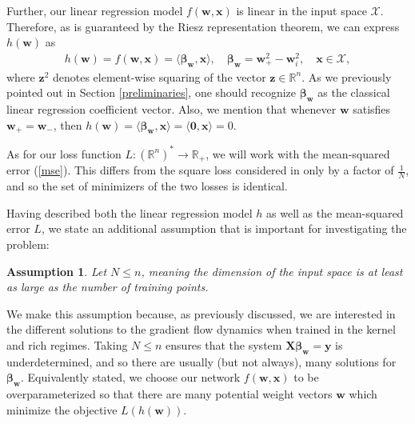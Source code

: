\documentclass{article}
\newtheorem*{assumption}{Assumption}
\begin{document}
Further, our linear regression model $f(\boldsymbol{w}, \boldsymbol{x})$ is linear in the input space $\mathcal{X}$. Therefore, as is guaranteed by the Riesz representation theorem, we can express $h(\boldsymbol{w})$ as 
\begin{align}
    h(\boldsymbol{w}) = f(\boldsymbol{w}, \boldsymbol{x}) = \langle \boldsymbol{\beta}_{\boldsymbol{w}}, \boldsymbol{x} \rangle, \quad \boldsymbol{\beta}_{\boldsymbol{w}} = \boldsymbol{w}_{+}^2 - \boldsymbol{w}_{i}^2, \quad \boldsymbol{x} \in \mathcal{X},
\end{align}
where $\boldsymbol{z}^2$ denotes element-wise squaring of the vector $\boldsymbol{z} \in \mathbb{R}^n$. As we previously pointed out in Section \ref{preliminaries}, one should recognize $\boldsymbol{\beta}_{\boldsymbol{w}}$ as the classical linear regression coefficient vector. Also, we mention that whenever $\boldsymbol{w}$ satisfies $\boldsymbol{w}_+ = \boldsymbol{w}_-$, then $h(\boldsymbol{w}) = \langle \boldsymbol{\beta}_{\boldsymbol{w}}, \boldsymbol{x} \rangle = \langle \boldsymbol{0}, \boldsymbol{x} \rangle = 0$.

As for our loss function $L: (\mathbb{R}^n)^* \rightarrow \mathbb{R}_+$, we will work with the mean-squared error (\ref{mse}). This differs from the square loss considered in \cite{woodworth2020kernel} only by a factor of $\frac{1}{N}$, and so the set of minimizers of the two losses is identical.

Having described both the linear regression model $h$ as well as the mean-squared error $L$, we state an additional assumption that is important for investigating the problem:
\begin{assumption}
Let $N \leq n$, meaning the dimension of the input space is at least as large as the number of training points.
\end{assumption}
We make this assumption because, as previously discussed, we are interested in the different solutions to the gradient flow dynamics when trained in the kernel and rich regimes. Taking $N \leq n$ ensures that the system $\boldsymbol{X}\boldsymbol{\beta}_{\boldsymbol{w}} = \boldsymbol{y}$ is underdetermined, and so there are usually (but not always), many solutions for $\boldsymbol{\beta}_{\boldsymbol{w}}$. Equivalently stated, we choose our network $f(\boldsymbol{w}, \boldsymbol{x})$ to be overparameterized so that there are many potential weight vectors $\boldsymbol{w}$ which minimize the objective $L(h(\boldsymbol{w}))$.
\end{document}
